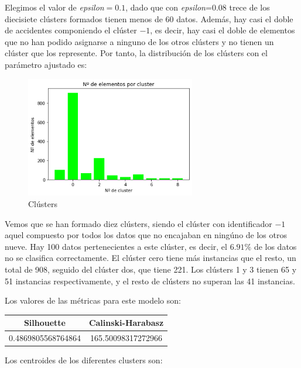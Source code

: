 \documentclass[a4]{article}
\begin{document}
Elegimos el valor de \textit{epsilon}$ = 0.1$, dado que con \textit{epsilon}=0.08 trece de los diecisiete clústers formados tienen menos de 60 datos. Además, hay casi el doble de accidentes componiendo el clúster $-1$, es decir, hay casi el doble de elementos que no han podido asignarse a ninguno de los otros clústers y no tienen un clúster que los represente. Por tanto, la distribución de los clústers con el parámetro ajustado es:

\begin{figure}[H]
  \centering
  \caption{Clústers}
  \includegraphics[width=74mm]{imagenes/c1_dbscan_cluster_01}
\end{figure}

Vemos que se han formado diez clústers, siendo el clúster con identificador $-1$  aquel compuesto por todos los datos que no encajaban en ningúno de los otros nueve. Hay 100 datos pertenecientes a este clúster, es decir, el $6.91\%$ de los datos no se clasifica correctamente. El clúster cero tiene más instancias que el resto, un total de 908, seguido del clúster dos, que tiene 221. Los clústers 1 y 3 tienen 65 y 51 instancias respectivamente, y el resto de clústers no superan las 41 instancias.

Los valores de las métricas para este modelo son:

\begin{center}
\begin{tabular}{|c|c|}
\hline
\multicolumn{1}{|c|}{\textbf{Silhouette}} & \textbf{Calinski-Harabasz}\\ \hline
  0.4869805568764864  & 165.50098317272966  \\ \hline
\end{tabular}
\end{center}

Los centroides de los diferentes clusters son:
\end{document}
